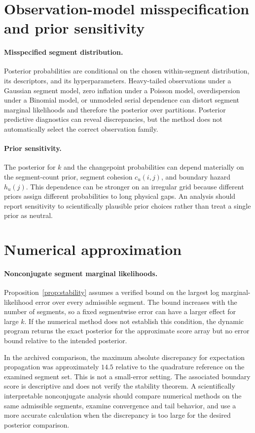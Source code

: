 \section{Observation-model misspecification and prior sensitivity}
\paragraph{Misspecified segment distribution.}
Posterior probabilities are conditional on the chosen within-segment distribution, its descriptors,
and its hyperparameters. Heavy-tailed observations under a Gaussian segment model, zero inflation
under a Poisson model, overdispersion under a Binomial model, or unmodeled serial dependence can
distort segment marginal likelihoods and therefore the posterior over partitions. Posterior
predictive diagnostics can reveal discrepancies, but the method does not automatically select the
correct observation family.

\paragraph{Prior sensitivity.}
The posterior for $k$ and the changepoint probabilities can depend materially on the segment-count
prior, segment cohesion $c_u(i,j)$, and boundary hazard $h_u(j)$. This dependence can be stronger on
an irregular grid because different priors assign different probabilities to long physical gaps.
An analysis should report sensitivity to scientifically plausible prior choices rather than treat a
single prior as neutral.

\section{Numerical approximation}
\paragraph{Nonconjugate segment marginal likelihoods.}
Proposition~\ref{prop:stability} assumes a verified bound on the largest log marginal-likelihood
error over every admissible segment. The bound increases with the number of segments, so a
fixed segmentwise error can have a larger effect for large $k$. If the numerical method does not
establish this condition, the dynamic program returns the exact posterior for the approximate score
array but no error bound relative to the intended posterior.

In the archived comparison, the maximum absolute discrepancy for expectation propagation was
approximately $14.5$ relative to the quadrature reference on the examined segment set. This is not
a small-error setting. The associated boundary score is descriptive and does not verify the
stability theorem. A scientifically interpretable nonconjugate analysis should compare numerical
methods on the same admissible segments, examine convergence and tail behavior, and use a more
accurate calculation when the discrepancy is too large for the desired posterior comparison.

